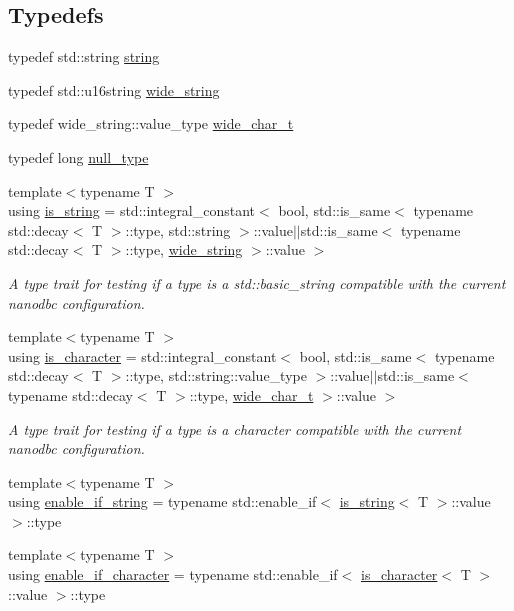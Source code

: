 \subsection*{Typedefs}
\begin{DoxyCompactItemize}
\item 
typedef std\+::string \mbox{\hyperlink{namespacenanodbc_abfc0ece56278e590911ec8352774c212}{string}}
\item 
typedef std\+::u16string \mbox{\hyperlink{namespacenanodbc_aeddf33f0df2bb9ba05323112e3aed316}{wide\+\_\+string}}
\item 
typedef wide\+\_\+string\+::value\+\_\+type \mbox{\hyperlink{namespacenanodbc_ad2d466f268b27c7f76a801379dbeb101}{wide\+\_\+char\+\_\+t}}
\item 
typedef long \mbox{\hyperlink{namespacenanodbc_ad636e9d08ea26f54100aa013031f8344}{null\+\_\+type}}
\item 
{\footnotesize template$<$typename T $>$ }\\using \mbox{\hyperlink{group__utility_gaac06d237b348a3040a5cb378e86af570}{is\+\_\+string}} = std\+::integral\+\_\+constant$<$ bool, std\+::is\+\_\+same$<$ typename std\+::decay$<$ T $>$\+::type, std\+::string $>$\+::value$\vert$$\vert$std\+::is\+\_\+same$<$ typename std\+::decay$<$ T $>$\+::type, \mbox{\hyperlink{namespacenanodbc_aeddf33f0df2bb9ba05323112e3aed316}{wide\+\_\+string}} $>$\+::value $>$
\begin{DoxyCompactList}\small\item\em A type trait for testing if a type is a std\+::basic\+\_\+string compatible with the current nanodbc configuration. \end{DoxyCompactList}\item 
{\footnotesize template$<$typename T $>$ }\\using \mbox{\hyperlink{group__utility_gadf207d0dda8d44076925a9d19fbfac0a}{is\+\_\+character}} = std\+::integral\+\_\+constant$<$ bool, std\+::is\+\_\+same$<$ typename std\+::decay$<$ T $>$\+::type, std\+::string\+::value\+\_\+type $>$\+::value$\vert$$\vert$std\+::is\+\_\+same$<$ typename std\+::decay$<$ T $>$\+::type, \mbox{\hyperlink{namespacenanodbc_ad2d466f268b27c7f76a801379dbeb101}{wide\+\_\+char\+\_\+t}} $>$\+::value $>$
\begin{DoxyCompactList}\small\item\em A type trait for testing if a type is a character compatible with the current nanodbc configuration. \end{DoxyCompactList}\item 
{\footnotesize template$<$typename T $>$ }\\using \mbox{\hyperlink{group__utility_ga0cf23526593c5647433a3dbdf7f582e3}{enable\+\_\+if\+\_\+string}} = typename std\+::enable\+\_\+if$<$ \mbox{\hyperlink{group__utility_gaac06d237b348a3040a5cb378e86af570}{is\+\_\+string}}$<$ T $>$\+::value $>$\+::type
\item 
{\footnotesize template$<$typename T $>$ }\\using \mbox{\hyperlink{group__utility_ga4de8f00ef2dfc16187ee819e4ff75602}{enable\+\_\+if\+\_\+character}} = typename std\+::enable\+\_\+if$<$ \mbox{\hyperlink{group__utility_gadf207d0dda8d44076925a9d19fbfac0a}{is\+\_\+character}}$<$ T $>$\+::value $>$\+::type
\end{DoxyCompactItemize}
